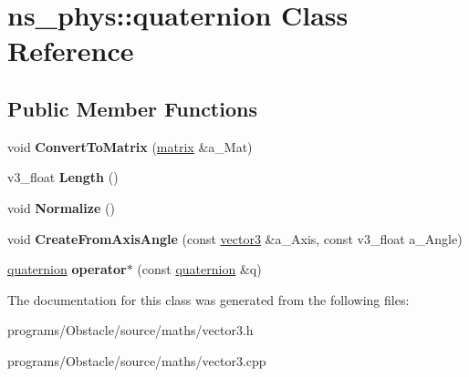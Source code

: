 \hypertarget{classns__phys_1_1quaternion}{}\section{ns\+\_\+phys\+:\+:quaternion Class Reference}
\label{classns__phys_1_1quaternion}
\subsection*{Public Member Functions}
\begin{DoxyCompactItemize}
\item 
void {\bfseries Convert\+To\+Matrix} (\hyperlink{classns__phys_1_1matrix}{matrix} \&a\+\_\+\+Mat)\hypertarget{classns__phys_1_1quaternion_a7e86bfc09ce3c360daf90f8d294daefc}{}\label{classns__phys_1_1quaternion_a7e86bfc09ce3c360daf90f8d294daefc}

\item 
v3\+\_\+float {\bfseries Length} ()\hypertarget{classns__phys_1_1quaternion_abaa4fe722ef8fa517bdba394c6d6c1b1}{}\label{classns__phys_1_1quaternion_abaa4fe722ef8fa517bdba394c6d6c1b1}

\item 
void {\bfseries Normalize} ()\hypertarget{classns__phys_1_1quaternion_af555f719f7b6aba59f0fc1137ea06a41}{}\label{classns__phys_1_1quaternion_af555f719f7b6aba59f0fc1137ea06a41}

\item 
void {\bfseries Create\+From\+Axis\+Angle} (const \hyperlink{classns__phys_1_1vector3}{vector3} \&a\+\_\+\+Axis, const v3\+\_\+float a\+\_\+\+Angle)\hypertarget{classns__phys_1_1quaternion_a7a9a14ca69f7c846bc34f5652c9f1a4e}{}\label{classns__phys_1_1quaternion_a7a9a14ca69f7c846bc34f5652c9f1a4e}

\item 
\hyperlink{classns__phys_1_1quaternion}{quaternion} {\bfseries operator$\ast$} (const \hyperlink{classns__phys_1_1quaternion}{quaternion} \&q)\hypertarget{classns__phys_1_1quaternion_a756db6eb886ba1991db00078b450b184}{}\label{classns__phys_1_1quaternion_a756db6eb886ba1991db00078b450b184}

\end{DoxyCompactItemize}


The documentation for this class was generated from the following files\+:\begin{DoxyCompactItemize}
\item 
programs/\+Obstacle/source/maths/vector3.\+h\item 
programs/\+Obstacle/source/maths/vector3.\+cpp\end{DoxyCompactItemize}
